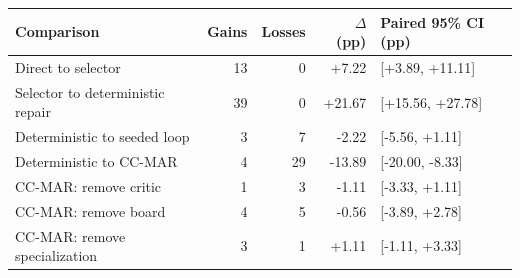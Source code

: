 \begin{tabular}{@{}lrrrl@{}}
\toprule
Comparison & Gains & Losses & $\Delta$ (pp) & Paired 95\% CI (pp) \\
\midrule
Direct to selector & 13 & 0 & +7.22 & [+3.89, +11.11] \\
Selector to deterministic repair & 39 & 0 & +21.67 & [+15.56, +27.78] \\
Deterministic to seeded loop & 3 & 7 & -2.22 & [-5.56, +1.11] \\
Deterministic to CC-MAR & 4 & 29 & -13.89 & [-20.00, -8.33] \\
CC-MAR: remove critic & 1 & 3 & -1.11 & [-3.33, +1.11] \\
CC-MAR: remove board & 4 & 5 & -0.56 & [-3.89, +2.78] \\
CC-MAR: remove specialization & 3 & 1 & +1.11 & [-1.11, +3.33] \\
\bottomrule
\end{tabular}
